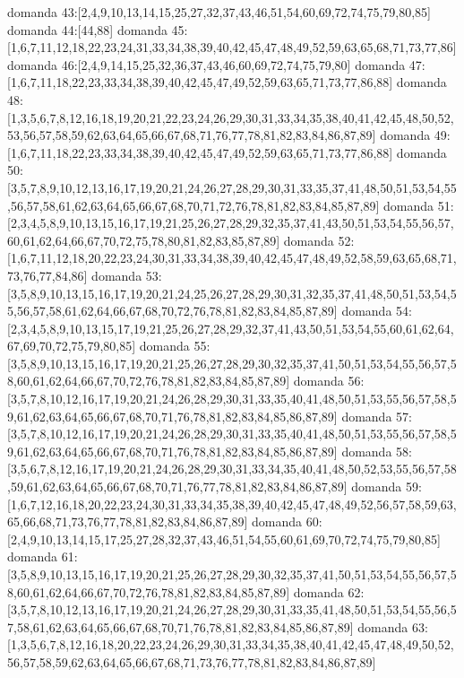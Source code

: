 domanda 43:[2,4,9,10,13,14,15,25,27,32,37,43,46,51,54,60,69,72,74,75,79,80,85]
domanda 44:[44,88]
domanda 45:[1,6,7,11,12,18,22,23,24,31,33,34,38,39,40,42,45,47,48,49,52,59,63,65,68,71,73,77,86]
domanda 46:[2,4,9,14,15,25,32,36,37,43,46,60,69,72,74,75,79,80]
domanda 47:[1,6,7,11,18,22,23,33,34,38,39,40,42,45,47,49,52,59,63,65,71,73,77,86,88]
domanda 48:[1,3,5,6,7,8,12,16,18,19,20,21,22,23,24,26,29,30,31,33,34,35,38,40,41,42,45,48,50,52,53,56,57,58,59,62,63,64,65,66,67,68,71,76,77,78,81,82,83,84,86,87,89]
domanda 49:[1,6,7,11,18,22,23,33,34,38,39,40,42,45,47,49,52,59,63,65,71,73,77,86,88]
domanda 50:[3,5,7,8,9,10,12,13,16,17,19,20,21,24,26,27,28,29,30,31,33,35,37,41,48,50,51,53,54,55,56,57,58,61,62,63,64,65,66,67,68,70,71,72,76,78,81,82,83,84,85,87,89]
domanda 51:[2,3,4,5,8,9,10,13,15,16,17,19,21,25,26,27,28,29,32,35,37,41,43,50,51,53,54,55,56,57,60,61,62,64,66,67,70,72,75,78,80,81,82,83,85,87,89]
domanda 52:[1,6,7,11,12,18,20,22,23,24,30,31,33,34,38,39,40,42,45,47,48,49,52,58,59,63,65,68,71,73,76,77,84,86]
domanda 53:[3,5,8,9,10,13,15,16,17,19,20,21,24,25,26,27,28,29,30,31,32,35,37,41,48,50,51,53,54,55,56,57,58,61,62,64,66,67,68,70,72,76,78,81,82,83,84,85,87,89]
domanda 54:[2,3,4,5,8,9,10,13,15,17,19,21,25,26,27,28,29,32,37,41,43,50,51,53,54,55,60,61,62,64,67,69,70,72,75,79,80,85]
domanda 55:[3,5,8,9,10,13,15,16,17,19,20,21,25,26,27,28,29,30,32,35,37,41,50,51,53,54,55,56,57,58,60,61,62,64,66,67,70,72,76,78,81,82,83,84,85,87,89]
domanda 56:[3,5,7,8,10,12,16,17,19,20,21,24,26,28,29,30,31,33,35,40,41,48,50,51,53,55,56,57,58,59,61,62,63,64,65,66,67,68,70,71,76,78,81,82,83,84,85,86,87,89]
domanda 57:[3,5,7,8,10,12,16,17,19,20,21,24,26,28,29,30,31,33,35,40,41,48,50,51,53,55,56,57,58,59,61,62,63,64,65,66,67,68,70,71,76,78,81,82,83,84,85,86,87,89]
domanda 58:[3,5,6,7,8,12,16,17,19,20,21,24,26,28,29,30,31,33,34,35,40,41,48,50,52,53,55,56,57,58,59,61,62,63,64,65,66,67,68,70,71,76,77,78,81,82,83,84,86,87,89]
domanda 59:[1,6,7,12,16,18,20,22,23,24,30,31,33,34,35,38,39,40,42,45,47,48,49,52,56,57,58,59,63,65,66,68,71,73,76,77,78,81,82,83,84,86,87,89]
domanda 60:[2,4,9,10,13,14,15,17,25,27,28,32,37,43,46,51,54,55,60,61,69,70,72,74,75,79,80,85]
domanda 61:[3,5,8,9,10,13,15,16,17,19,20,21,25,26,27,28,29,30,32,35,37,41,50,51,53,54,55,56,57,58,60,61,62,64,66,67,70,72,76,78,81,82,83,84,85,87,89]
domanda 62:[3,5,7,8,10,12,13,16,17,19,20,21,24,26,27,28,29,30,31,33,35,41,48,50,51,53,54,55,56,57,58,61,62,63,64,65,66,67,68,70,71,76,78,81,82,83,84,85,86,87,89]
domanda 63:[1,3,5,6,7,8,12,16,18,20,22,23,24,26,29,30,31,33,34,35,38,40,41,42,45,47,48,49,50,52,56,57,58,59,62,63,64,65,66,67,68,71,73,76,77,78,81,82,83,84,86,87,89]
